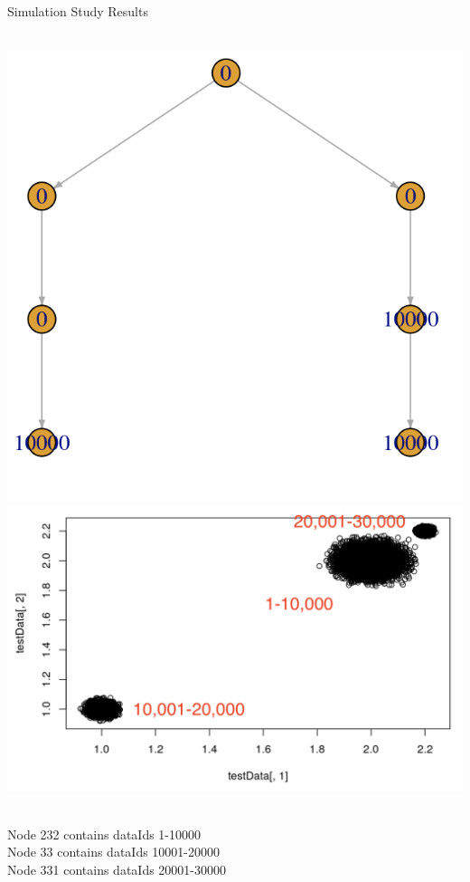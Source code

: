 \documentclass[10 pt]{beamer}
\begin{document}
\begin{frame}{Simulation Study}
	Results\\
	~\\
	\centerline{\includegraphics[scale=0.3]{figs/sim2Res.png}\includegraphics[scale=0.2]{figs/simulationData2.png}}
	~\\
Node 232 contains dataIds 1-10000\\
Node 33 contains dataIds 10001-20000\\ 
Node 331 contains dataIds 20001-30000
\end{frame}
\end{document}
